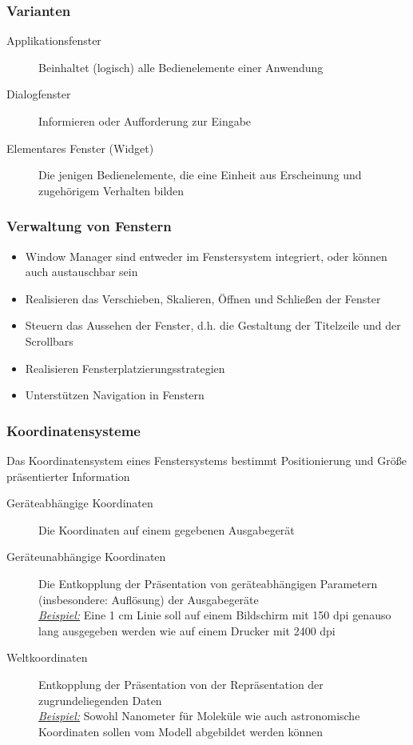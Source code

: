 \documentclass[8pt,a4paper,landscape]{extarticle}
\newcommand{\example}{\textit{\underline{Beispiel:} }}
\begin{document}
\begin{multicols*}{4}
	\subsubsection{Varianten}
	\begin{description}
		\item[Applikationsfenster] Beinhaltet (logisch) alle Bedienelemente
		      einer Anwendung
		\item[Dialogfenster] Informieren oder Aufforderung zur Eingabe
		\item[Elementares Fenster (Widget)] Die jenigen Bedienelemente, die eine
		      Einheit aus Erscheinung und zugehörigem Verhalten bilden
	\end{description}
	\subsubsection{Verwaltung von Fenstern}
	\begin{itemize}
		\item Window Manager sind entweder im Fenstersystem integriert, oder
		      können auch austauschbar sein
		\item Realisieren das Verschieben, Skalieren, Öffnen und Schließen der
		      Fenster
		\item Steuern das Aussehen der Fenster, d.h. die Gestaltung der
		      Titelzeile und der Scrollbars
		\item Realisieren Fensterplatzierungsstrategien
		\item Unterstützen Navigation in Fenstern
	\end{itemize}
	\subsubsection{Koordinatensysteme}
	Das Koordinatensystem eines Fenstersystems bestimmt Positionierung und Größe
	präsentierter Information
	\begin{description}
		\item[Geräteabhängige Koordinaten] Die Koordinaten auf einem gegebenen
		      Ausgabegerät
		\item[Geräteunabhängige Koordinaten] Die Entkopplung der Präsentation
		      von geräteabhängigen Parametern (insbesondere: Auflösung) der
		      Ausgabegeräte \\
		      \example Eine 1 cm Linie soll auf einem Bildschirm mit 150 dpi
		      genauso lang ausgegeben werden wie auf einem Drucker mit 2400 dpi
		\item[Weltkoordinaten] Entkopplung der Präsentation von der
		      Repräsentation der zugrundeliegenden Daten \\
		      \example Sowohl Nanometer für Moleküle wie auch astronomische
		      Koordinaten sollen vom Modell abgebildet werden können
	\end{description}

\end{multicols*}
\end{document}
